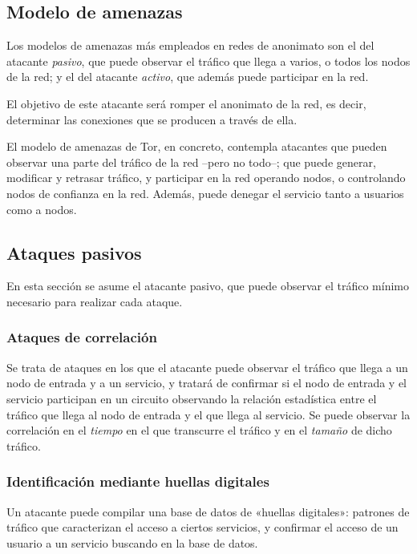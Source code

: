 \documentclass[
  a4paper,
  12pt,
  spanish,
]{scrartcl}
\begin{document}
\subsection{Modelo de amenazas}

Los modelos de amenazas más empleados en redes de anonimato son el del atacante
\emph{pasivo}, que puede observar el tráfico que llega a varios, o todos los
nodos de la red; y el del atacante \emph{activo}, que además puede participar en
la red.

El objetivo de este atacante será romper el anonimato de la red, es decir,
determinar las conexiones que se producen a través de ella.

El modelo de amenazas de Tor, en concreto, contempla atacantes que pueden
observar una parte del tráfico de la red --pero no todo--; que puede generar,
modificar y retrasar tráfico, y participar en la red operando nodos, o
controlando nodos de confianza en la red. Además, puede denegar el servicio
tanto a usuarios como a nodos.

\subsection{Ataques pasivos}

En esta sección se asume el atacante pasivo, que puede observar el tráfico
mínimo necesario para realizar cada ataque.

\subsubsection{Ataques de correlación} \label{corrat}

Se trata de ataques en los que el atacante puede observar el tráfico que llega a
un nodo de entrada y a un servicio, y tratará de confirmar si el nodo de entrada
y el servicio participan en un circuito observando la relación estadística entre
el tráfico que llega al nodo de entrada y el que llega al servicio. Se puede
observar la correlación en el \emph{tiempo} en el que transcurre el tráfico y en
el \emph{tamaño} de dicho tráfico.

\subsubsection{Identificación mediante huellas digitales}

Un atacante puede compilar una base de datos de «huellas digitales»: patrones de
tráfico que caracterizan el acceso a ciertos servicios, y confirmar el acceso de
un usuario a un servicio buscando en la base de datos.
\end{document}
